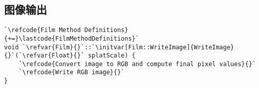 \subsection{图像输出}\label{sub:图像输出}
\begin{lstlisting}
`\refcode{Film Method Definitions}{+=}\lastcode{FilmMethodDefinitions}`
void `\refvar{Film}{}`::`\initvar[Film::WriteImage]{WriteImage}{}`(`\refvar{Float}{}` splatScale) {
    `\refcode{Convert image to RGB and compute final pixel values}{}`
    `\refcode{Write RGB image}{}`
}
\end{lstlisting}